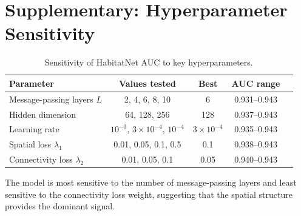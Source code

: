 \section{Supplementary: Hyperparameter Sensitivity}

\label{app:hyperparameters}

\begin{table}[H]
\centering
\caption{Sensitivity of HabitatNet AUC to key hyperparameters.}
\label{tab:hyperparams}
\begin{tabular}{lcccc}
\toprule
\textbf{Parameter} & \textbf{Values tested} & \textbf{Best} & \textbf{AUC range} \\
\midrule
Message-passing layers $L$ & 2, 4, 6, 8, 10 & 6 & 0.931--0.943 \\
Hidden dimension & 64, 128, 256 & 128 & 0.937--0.943 \\
Learning rate & $10^{-3}$, $3\times10^{-4}$, $10^{-4}$ & $3\times10^{-4}$ & 0.935--0.943 \\
Spatial loss $\lambda_1$ & 0.01, 0.05, 0.1, 0.5 & 0.1 & 0.938--0.943 \\
Connectivity loss $\lambda_2$ & 0.01, 0.05, 0.1 & 0.05 & 0.940--0.943 \\
\bottomrule
\end{tabular}
\end{table}

The model is most sensitive to the number of message-passing layers and
least sensitive to the connectivity loss weight, suggesting that the
spatial structure provides the dominant signal.

